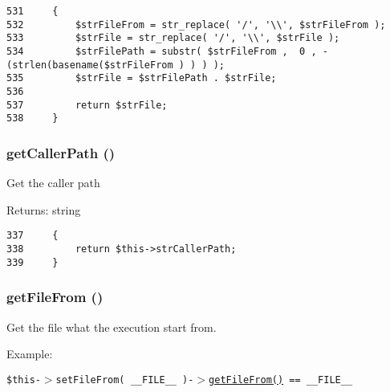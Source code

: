 \begin{Code}\begin{verbatim}531     {
532         $strFileFrom = str_replace( '/', '\\', $strFileFrom );
533         $strFile = str_replace( '/', '\\', $strFile );
534         $strFilePath = substr( $strFileFrom ,  0 , -(strlen(basename($strFileFrom ) ) ) );
535         $strFile = $strFilePath . $strFile;
536 
537         return $strFile;
538     }
\end{verbatim}
\end{Code}


\hypertarget{class_code_to_diagram_a8c839c9d33ebad153541a31ffc7ef3e}{
\subsubsection[{getCallerPath}]{\setlength{\rightskip}{0pt plus 5cm}getCallerPath ()}}
\label{class_code_to_diagram_a8c839c9d33ebad153541a31ffc7ef3e}


Get the caller path

\begin{Desc}
\item[Returns:]string \end{Desc}


\begin{Code}\begin{verbatim}337     {
338         return $this->strCallerPath;
339     }
\end{verbatim}
\end{Code}


\hypertarget{class_code_to_diagram_8fea886bcd0b31bd46eca66b26dd18b8}{
\subsubsection[{getFileFrom}]{\setlength{\rightskip}{0pt plus 5cm}getFileFrom ()}}
\label{class_code_to_diagram_8fea886bcd0b31bd46eca66b26dd18b8}


Get the file what the execution start from.

\begin{Desc}
\item[Example:]\end{Desc}
{\tt  \$this-$>$setFileFrom( \_\-\_\-FILE\_\-\_\- )-$>$\hyperlink{class_code_to_diagram_8fea886bcd0b31bd46eca66b26dd18b8}{getFileFrom()} == \_\-\_\-FILE\_\-\_\- }

